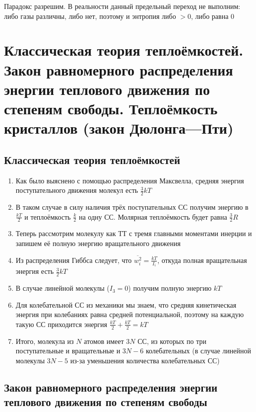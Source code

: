 \documentclass[a4paper, 14pt]{article}
\begin{document}
    Парадокс разрешим.
    В реальности данный предельный переход не выполним: либо газы различны, либо нет, поэтому и энтропия либо $>0$,
    либо равна $0$

    \section{Классическая теория теплоёмкостей.
    Закон равномерного распределения энергии теплового движения по степеням свободы.
    Теплоёмкость кристаллов (закон Дюлонга—Пти)}

    \subsection{Классическая теория теплоёмкостей}

    \begin{enumerate}
        \item Как было выяснено с помощью распределения Максвелла, средняя энергия поступательного движения молекул
        есть $\frac{3}{2} kT$
        \item В таком случае в силу наличия трёх поступательных СС получим энергию в $\frac{kT}{2}$ и теплоёмкость
        $\frac{k}{2}$ на одну СС.
        Молярная теплоёмкость будет равна $\frac{3}{2}R$
        \item Теперь рассмотрим молекулу как ТТ с тремя главными моментами инерции и запишем её полную энергию
        вращательного движения
        \item Из распределения Гиббса следует, что $\overline{w^2_i} = \frac{kT}{I_i}$, откуда полная вращательная
        энергия есть $\frac{3}{2} kT$
        \item В случае линейной молекулы ($I_3 = 0$) получим полную энергию $kT$
        \item Для колебательной СС из механики мы знаем, что средняя кинетическая энергия при колебаниях равна
        средней потенциальной, поэтому на каждую такую СС приходится энергия $\frac{kT}{2} + \frac{kT}{2} = kT$
        \item Итого, молекула из $N$ атомов имеет $3N$ СС, из которых по три поступательные и вращательные и $3N - 6$
        колебательных (в случае линейной молекулы $3N - 5$ из-за уменьшения количества колебательных СС)
    \end{enumerate}

    \subsection{Закон равномерного распределения энергии теплового движения по степеням свободы}
\end{document}
